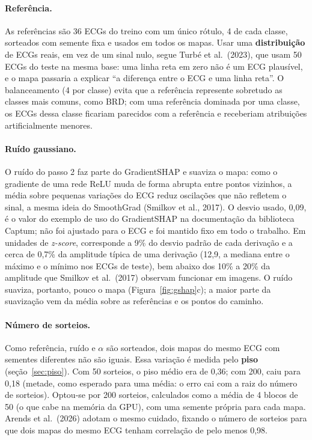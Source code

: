 \documentclass[11pt,a4paper]{article}
\begin{document}
\paragraph{Referência.} As referências são 36 ECGs do treino com um único rótulo, 4 de cada classe, sorteados com semente fixa e usados em todos os mapas. Usar uma \textbf{distribuição} de ECGs reais, em vez de um sinal nulo, segue Turbé et al.\ (2023), que usam 50 ECGs do teste na mesma base: uma linha reta em zero não é um ECG plausível, e o mapa passaria a explicar ``a diferença entre o ECG e uma linha reta''. O balanceamento (4 por classe) evita que a referência represente sobretudo as classes mais comuns, como BRD; com uma referência dominada por uma classe, os ECGs dessa classe ficariam parecidos com a referência e receberiam atribuições artificialmente menores.

\paragraph{Ruído gaussiano.} O ruído do passo 2 faz parte do GradientSHAP e suaviza o mapa: como o gradiente de uma rede ReLU muda de forma abrupta entre pontos vizinhos, a média sobre pequenas variações do ECG reduz oscilações que não refletem o sinal, a mesma ideia do SmoothGrad (Smilkov et al., 2017). O desvio usado, 0,09, é o valor do exemplo de uso do GradientSHAP na documentação da biblioteca Captum; não foi ajustado para o ECG e foi mantido fixo em todo o trabalho. Em unidades de \textit{z-score}, corresponde a 9\% do desvio padrão de cada derivação e a cerca de 0,7\% da amplitude típica de uma derivação (12,9, a mediana entre o máximo e o mínimo nos ECGs de teste), bem abaixo dos 10\% a 20\% da amplitude que Smilkov et al.\ (2017) observam funcionar em imagens. O ruído suaviza, portanto, pouco o mapa (Figura~\ref{fig:gshap}c); a maior parte da suavização vem da média sobre as referências e os pontos do caminho.

\paragraph{Número de sorteios.} Como referência, ruído e $\alpha$ são sorteados, dois mapas do mesmo ECG com sementes diferentes não são iguais. Essa variação é medida pelo \textbf{piso} (seção~\ref{sec:piso}). Com 50 sorteios, o piso médio era de 0,36; com 200, caiu para 0,18 (metade, como esperado para uma média: o erro cai com a raiz do número de sorteios). Optou-se por 200 sorteios, calculados como a média de 4 blocos de 50 (o que cabe na memória da GPU), com uma semente própria para cada mapa. Arends et al.\ (2026) adotam o mesmo cuidado, fixando o número de sorteios para que dois mapas do mesmo ECG tenham correlação de pelo menos 0,98.
\end{document}
